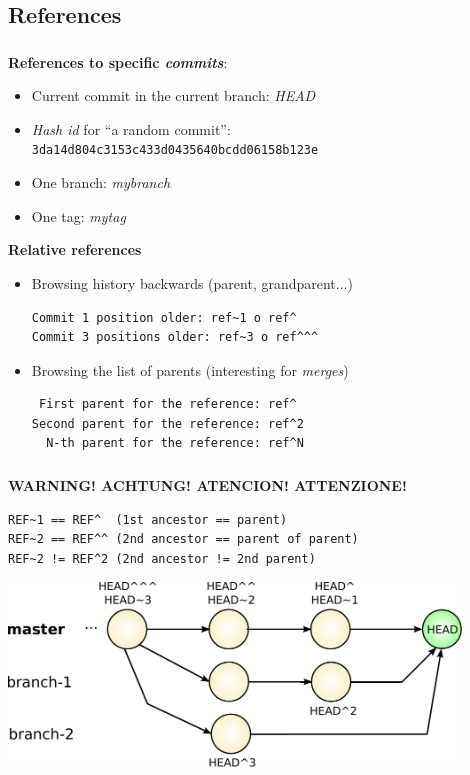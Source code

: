 \subsection{References}
\begin{frame}[fragile]
  \frametitle{\insertsubsection}

  \textbf{References to specific \textit{commits}}:
  \begin{itemize}
  \item Current commit in the current branch: \textit{HEAD}
  \item \textit{Hash id} for ``a random commit'': \texttt{3da14d804c3153c433d0435640bcdd06158b123e}
  \item One branch: \textit{mybranch}
  \item One tag: \textit{mytag}
  \end{itemize}\vspacing

  \textbf{Relative references}
  \begin{itemize}
  \item Browsing history backwards (parent, grandparent...)
\begin{verbatim}
Commit 1 position older: ref~1 o ref^
Commit 3 positions older: ref~3 o ref^^^
\end{verbatim}

  \item Browsing the list of parents (interesting for \textit{merges})
\begin{verbatim}
 First parent for the reference: ref^
Second parent for the reference: ref^2
  N-th parent for the reference: ref^N
\end{verbatim}
  \end{itemize}

\end{frame}

\begin{frame}[fragile]
  \frametitle{\insertsubsection}

\textbf{WARNING! ACHTUNG! ATENCION! ATTENZIONE!}
\begin{verbatim}
REF~1 == REF^  (1st ancestor == parent)
REF~2 == REF^^ (2nd ancestor == parent of parent)
REF~2 != REF^2 (2nd ancestor != 2nd parent)
\end{verbatim}

\begin{center}
  \includegraphics[width=0.9\textwidth]{images/pdf/git-references.pdf}
\end{center}

\end{frame}

